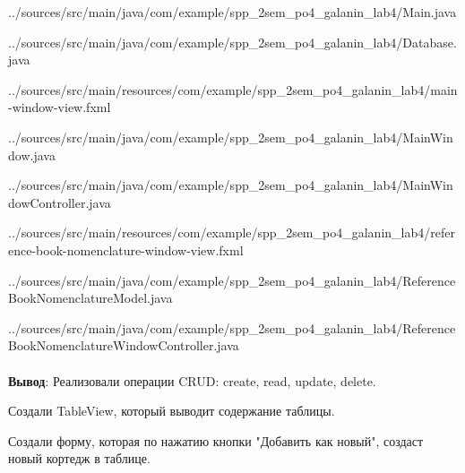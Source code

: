 \documentclass[12pt, a4paper, simple]{eskdtext}
\begin{document}
    
    {../sources/src/main/java/com/example/spp_2sem_po4_galanin_lab4/Main.java}

    
    {../sources/src/main/java/com/example/spp_2sem_po4_galanin_lab4/Database.java}

    
    {../sources/src/main/resources/com/example/spp_2sem_po4_galanin_lab4/main-window-view.fxml}

    
    {../sources/src/main/java/com/example/spp_2sem_po4_galanin_lab4/MainWindow.java}

    
    {../sources/src/main/java/com/example/spp_2sem_po4_galanin_lab4/MainWindowController.java}

    
    {../sources/src/main/resources/com/example/spp_2sem_po4_galanin_lab4/reference-book-nomenclature-window-view.fxml}

    
    {../sources/src/main/java/com/example/spp_2sem_po4_galanin_lab4/ReferenceBookNomenclatureModel.java}

    
    {../sources/src/main/java/com/example/spp_2sem_po4_galanin_lab4/ReferenceBookNomenclatureWindowController.java}


    \paragraph{} \textbf{Вывод}:
    Реализовали операции CRUD: create, read, update, delete.

    Создали TableView, который выводит содержание таблицы.

    Создали форму, которая по нажатию кнопки "Добавить как новый",
    создаст новый кортедж в таблице.
\end{document}
